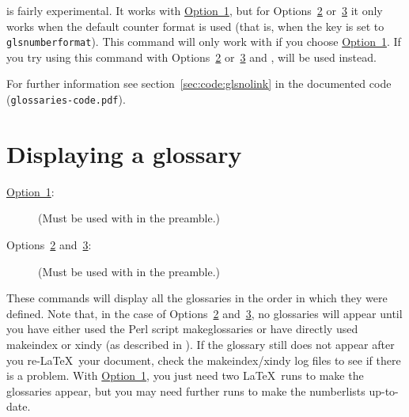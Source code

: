 \documentclass[report,inlinetitle]{nlctdoc}
\newcommand{\itempar}[1]{\item[{#1}]\mbox{}\par}
\newcommand*{\opt}[1]{\hyperlink{option#1}{Option~#1}}
\newcommand*{\optsor}[2]{Options~\hyperlink{option#1}{#1}
or~\hyperlink{option#2}{#2}}
\newcommand*{\optsand}[2]{Options~\hyperlink{option#1}{#1}
and~\hyperlink{option#2}{#2}}
\newcommand*{\gloskey}[2][newglossaryentry]{\csopt{#1}{#2}}
\begin{document}
\begin{important}
 is fairly experimental. It works with
\opt1, but for \optsor23 it only works when the default counter
format is used (that is, when the \gloskey[glslink]{format} key is
set to \texttt{glsnumberformat}).  This command will only work with
 if you choose \opt1.  If you try using this command
with \optsor23 and ,  will be
used instead.
\end{important}

For further information see \ifpdf section~\ref*{sec:code:glsnolink}
\fi {} in the documented code (\texttt{glossaries-code.pdf}).

\chapter{Displaying a glossary}
\label{sec:printglossary}

\begin{description}
\itempar{\opt1:}
\begin{definition}[\DescribeMacro{\printnoidxglossaries}]
\end{definition}
(Must be used with  in the preamble.)

\itempar{\optsand23:}
\begin{definition}[\DescribeMacro{\printglossaries}]
\end{definition}
(Must be used with  in the preamble.)
\end{description}

These commands will display all the glossaries in the order in which they were
defined. Note that, in the case of \optsand23, no glossaries will appear until you have either
used the Perl script \gls{makeglossaries} or have directly used
\gls{makeindex} or \gls{xindy} (as described in
). If the glossary 
still does not appear after you re-\LaTeX\ your document, check the
\gls*{makeindex}\slash\gls*{xindy} log files to see if there is a problem.
With \opt1, you just need two \LaTeX\ runs to make the glossaries appear, 
but you may need further runs to make the \glspl{numberlist} up-to-date.
\end{document}
